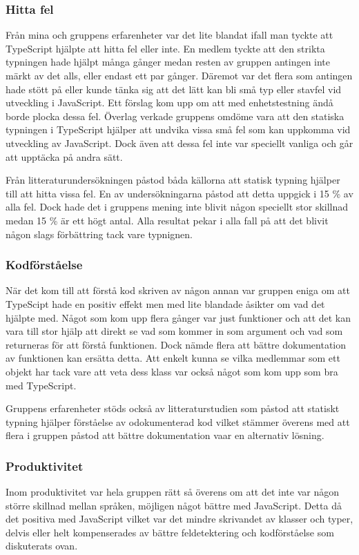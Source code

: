 \subsubsection{Hitta fel}
Från mina och gruppens erfarenheter var det lite blandat ifall man tyckte att TypeScript hjälpte att hitta fel eller inte. En medlem tyckte att den strikta typningen hade hjälpt många gånger medan resten av gruppen antingen inte märkt av det alls, eller endast ett par gånger. Däremot var det flera som antingen hade stött på eller kunde tänka sig att det lätt kan bli små typ eller stavfel vid utveckling i JavaScript. Ett förslag kom upp om att med enhetstestning ändå borde plocka dessa fel. Överlag verkade gruppens omdöme vara att den statiska typningen i TypeScript hjälper att undvika vissa små fel som kan uppkomma vid utveckling av JavaScript. Dock även att dessa fel inte var speciellt vanliga och går att upptäcka på andra sätt.

Från litteraturundersökningen påstod båda källorna att statisk typning hjälper till att hitta vissa fel. En av undersökningarna påstod att detta uppgick i 15 \% av alla fel. \cite{henrik_totypeornot} Dock hade det i gruppens mening inte blivit någon speciellt stor skillnad medan 15 \% är ett högt antal. Alla resultat pekar i alla fall på att det blivit någon slags förbättring tack vare typnignen.
\subsubsection{Kodförståelse}
När det kom till att förstå kod skriven av någon annan var gruppen eniga om att TypeScipt hade en positiv effekt men med lite blandade åsikter om vad det hjälpte med. Något som kom upp flera gånger var just funktioner och att det kan vara till stor hjälp att direkt se vad som kommer in som argument och vad som returneras för att förstå funktionen. Dock nämde flera att bättre dokumentation av funktionen kan ersätta detta. Att enkelt kunna se vilka medlemmar som ett objekt har tack vare att veta dess klass var också något som kom upp som bra med TypeScript.

Gruppens erfarenheter stöds också av litteraturstudien som påstod att statiskt typning hjälper förståelse av odokumenterad kod \cite{henrik_maintainability} vilket stämmer överens med att flera i gruppen påstod att bättre dokumentation vaar en alternativ lösning.
\subsubsection{Produktivitet}
Inom produktivitet var hela gruppen rätt så överens om att det inte var någon större skillnad mellan språken, möjligen något bättre med JavaScript. Detta då det positiva med JavaScript vilket var det mindre skrivandet av klasser och typer, delvis eller helt kompenserades av bättre feldetektering och kodförståelse som diskuterats ovan.

